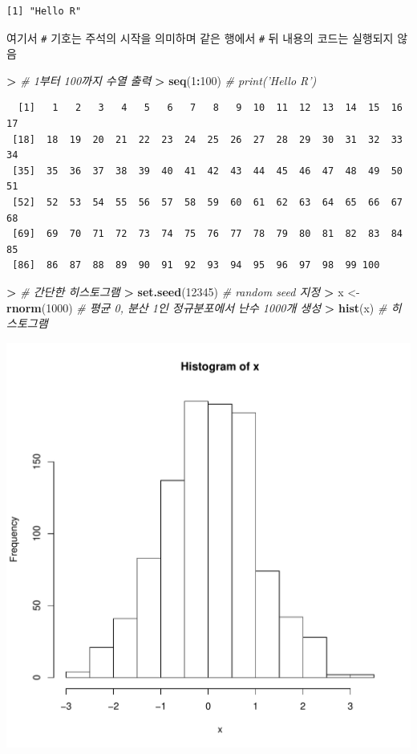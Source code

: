 \documentclass[12pt,a4paper]{book}
\newenvironment{Shaded}{\begin{snugshade}}{\end{snugshade}}
\newcommand{\KeywordTok}[1]{\textcolor[rgb]{0.13,0.29,0.53}{\textbf{#1}}}
\newcommand{\DecValTok}[1]{\textcolor[rgb]{0.00,0.00,0.81}{#1}}
\newcommand{\StringTok}[1]{\textcolor[rgb]{0.31,0.60,0.02}{#1}}
\newcommand{\CommentTok}[1]{\textcolor[rgb]{0.56,0.35,0.01}{\textit{#1}}}
\newcommand{\OperatorTok}[1]{\textcolor[rgb]{0.81,0.36,0.00}{\textbf{#1}}}
\newcommand{\ErrorTok}[1]{\textcolor[rgb]{0.64,0.00,0.00}{\textbf{#1}}}
\newcommand{\NormalTok}[1]{#1}
\theoremstyle{definition}
\theoremstyle{definition}
\theoremstyle{definition}
\theoremstyle{remark}
\begin{document}
\begin{verbatim}
[1] "Hello R"
\end{verbatim}

여기서 \texttt{\#} 기호는 주석의 시작을 의미하며 같은 행에서 \texttt{\#}
뒤 내용의 코드는 실행되지 않음

\begin{Shaded}
\begin{Highlighting}[]
\OperatorTok{>}\StringTok{ }\CommentTok{# 1부터 100까지 수열 출력}
\ErrorTok{>}\StringTok{ }\KeywordTok{seq}\NormalTok{(}\DecValTok{1}\OperatorTok{:}\DecValTok{100}\NormalTok{)  }\CommentTok{# print('Hello R')}
\end{Highlighting}
\end{Shaded}

\begin{verbatim}
  [1]   1   2   3   4   5   6   7   8   9  10  11  12  13  14  15  16  17
 [18]  18  19  20  21  22  23  24  25  26  27  28  29  30  31  32  33  34
 [35]  35  36  37  38  39  40  41  42  43  44  45  46  47  48  49  50  51
 [52]  52  53  54  55  56  57  58  59  60  61  62  63  64  65  66  67  68
 [69]  69  70  71  72  73  74  75  76  77  78  79  80  81  82  83  84  85
 [86]  86  87  88  89  90  91  92  93  94  95  96  97  98  99 100
\end{verbatim}

\begin{Shaded}
\begin{Highlighting}[]
\OperatorTok{>}\StringTok{ }\CommentTok{# 간단한 히스토그램}
\ErrorTok{>}\StringTok{ }\KeywordTok{set.seed}\NormalTok{(}\DecValTok{12345}\NormalTok{)  }\CommentTok{# random seed 지정}
\OperatorTok{>}\StringTok{ }\NormalTok{x <-}\StringTok{ }\KeywordTok{rnorm}\NormalTok{(}\DecValTok{1000}\NormalTok{)  }\CommentTok{# 평균 0, 분산 1인 정규분포에서 난수 1000개 생성}
\OperatorTok{>}\StringTok{ }\KeywordTok{hist}\NormalTok{(x)  }\CommentTok{# 히스토그램}
\end{Highlighting}
\end{Shaded}

\begin{center}\includegraphics[width=10 cm,height=10 cm]{Figures/check-03-1} \end{center}
\end{document}
